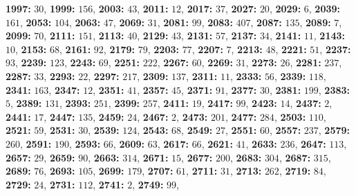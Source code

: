 \textsf{\bfseries 1997:} $30$, \textsf{\bfseries 1999:} $156$, \textsf{\bfseries 2003:} $43$, \textsf{\bfseries 2011:} $12$, \textsf{\bfseries 2017:} $37$, \textsf{\bfseries 2027:} $20$, \textsf{\bfseries 2029:} $6$, \textsf{\bfseries 2039:} $161$, \textsf{\bfseries 2053:} $104$, \textsf{\bfseries 2063:} $47$, \textsf{\bfseries 2069:} $31$, \textsf{\bfseries 2081:} $99$, \textsf{\bfseries 2083:} $407$, \textsf{\bfseries 2087:} $135$, \textsf{\bfseries 2089:} $7$, \textsf{\bfseries 2099:} $70$, \textsf{\bfseries 2111:} $151$, \textsf{\bfseries 2113:} $40$, \textsf{\bfseries 2129:} $43$, \textsf{\bfseries 2131:} $57$, \textsf{\bfseries 2137:} $34$, \textsf{\bfseries 2141:} $11$, \textsf{\bfseries 2143:} $10$, \textsf{\bfseries 2153:} $68$, \textsf{\bfseries 2161:} $92$, \textsf{\bfseries 2179:} $79$, \textsf{\bfseries 2203:} $77$, \textsf{\bfseries 2207:} $7$, \textsf{\bfseries 2213:} $48$, \textsf{\bfseries 2221:} $51$, \textsf{\bfseries 2237:} $93$, \textsf{\bfseries 2239:} $123$, \textsf{\bfseries 2243:} $69$, \textsf{\bfseries 2251:} $222$, \textsf{\bfseries 2267:} $60$, \textsf{\bfseries 2269:} $31$, \textsf{\bfseries 2273:} $26$, \textsf{\bfseries 2281:} $237$, \textsf{\bfseries 2287:} $33$, \textsf{\bfseries 2293:} $22$, \textsf{\bfseries 2297:} $217$, \textsf{\bfseries 2309:} $137$, \textsf{\bfseries 2311:} $11$, \textsf{\bfseries 2333:} $56$, \textsf{\bfseries 2339:} $118$, \textsf{\bfseries 2341:} $163$, \textsf{\bfseries 2347:} $12$, \textsf{\bfseries 2351:} $41$, \textsf{\bfseries 2357:} $45$, \textsf{\bfseries 2371:} $91$, \textsf{\bfseries 2377:} $30$, \textsf{\bfseries 2381:} $199$, \textsf{\bfseries 2383:} $5$, \textsf{\bfseries 2389:} $131$, \textsf{\bfseries 2393:} $251$, \textsf{\bfseries 2399:} $257$, \textsf{\bfseries 2411:} $19$, \textsf{\bfseries 2417:} $99$, \textsf{\bfseries 2423:} $14$, \textsf{\bfseries 2437:} $2$, \textsf{\bfseries 2441:} $17$, \textsf{\bfseries 2447:} $135$, \textsf{\bfseries 2459:} $24$, \textsf{\bfseries 2467:} $2$, \textsf{\bfseries 2473:} $201$, \textsf{\bfseries 2477:} $284$, \textsf{\bfseries 2503:} $110$, \textsf{\bfseries 2521:} $59$, \textsf{\bfseries 2531:} $30$, \textsf{\bfseries 2539:} $124$, \textsf{\bfseries 2543:} $68$, \textsf{\bfseries 2549:} $27$, \textsf{\bfseries 2551:} $60$, \textsf{\bfseries 2557:} $237$, \textsf{\bfseries 2579:} $260$, \textsf{\bfseries 2591:} $190$, \textsf{\bfseries 2593:} $66$, \textsf{\bfseries 2609:} $63$, \textsf{\bfseries 2617:} $66$, \textsf{\bfseries 2621:} $41$, \textsf{\bfseries 2633:} $236$, \textsf{\bfseries 2647:} $113$, \textsf{\bfseries 2657:} $29$, \textsf{\bfseries 2659:} $90$, \textsf{\bfseries 2663:} $314$, \textsf{\bfseries 2671:} $15$, \textsf{\bfseries 2677:} $200$, \textsf{\bfseries 2683:} $304$, \textsf{\bfseries 2687:} $315$, \textsf{\bfseries 2689:} $76$, \textsf{\bfseries 2693:} $105$, \textsf{\bfseries 2699:} $179$, \textsf{\bfseries 2707:} $61$, \textsf{\bfseries 2711:} $31$, \textsf{\bfseries 2713:} $262$, \textsf{\bfseries 2719:} $84$, \textsf{\bfseries 2729:} $24$, \textsf{\bfseries 2731:} $112$, \textsf{\bfseries 2741:} $2$, \textsf{\bfseries 2749:} $99$, 
